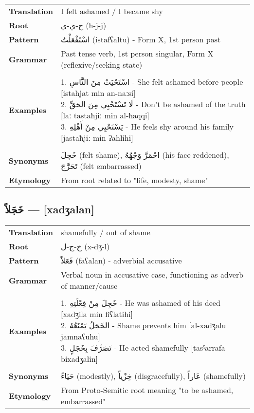 \documentclass[letterpaper,12pt]{article}
\begin{document}
\begin{tabular}{p{3cm}p{10cm}}
\toprule
\textbf{Translation} & I felt ashamed / I became shy \\
\textbf{Root} & \textarabic{ح-ي-ي} (ħ-j-j) \\
\textbf{Pattern} & \textarabic{اسْتَفْعَلْتُ} (istafʕaltu) - Form X, 1st person past \\
\textbf{Grammar} & Past tense verb, 1st person singular, Form X (reflexive/seeking state) \\
\midrule \\
\textbf{Examples} & \makecell[l]{\parbox{9.5cm}{
1. \textarabic{اسْتَحْيَتْ مِنَ النَّاسِ} - She felt ashamed before people [istaħjat min an-naːsi]\\
2. \textarabic{لَا تَسْتَحْيِي مِنَ الحَقِّ} - Don't be ashamed of the truth [laː tastaħjiː min al-ħaqqi]\\
3. \textarabic{يَسْتَحْيِي مِنْ أَهْلِهِ} - He feels shy around his family [jastaħjiː min ʔahlihi]
}} \\
\midrule \\
\textbf{Synonyms} & \textarabic{خَجِلَ} (felt shame), \textarabic{احْمَرَّ وَجْهُهُ} (his face reddened), \textarabic{تَحَرَّجَ} (felt embarrassed) \\
\textbf{Etymology} & From root related to "life, modesty, shame" \\
\bottomrule
\end{tabular}

\subsection{\textarabic{خَجَلاً} — [xadʒalan]}

\begin{tabular}{p{3cm}p{10cm}}
\toprule
\textbf{Translation} & shamefully / out of shame \\
\textbf{Root} & \textarabic{خ-ج-ل} (x-dʒ-l) \\
\textbf{Pattern} & \textarabic{فَعَلاً} (faʕalan) - adverbial accusative \\
\textbf{Grammar} & Verbal noun in accusative case, functioning as adverb of manner/cause \\
\midrule \\
\textbf{Examples} & \makecell[l]{\parbox{9.5cm}{
1. \textarabic{خَجِلَ مِنْ فِعْلَتِهِ} - He was ashamed of his deed [xadʒila min fiʕlatihi]\\
2. \textarabic{الخَجَلُ يَمْنَعُهُ} - Shame prevents him [al-xadʒalu jamnaʕuhu]\\
3. \textarabic{تَصَرَّفَ بِخَجَلٍ} - He acted shamefully [tasˤarrafa bixadʒalin]
}} \\
\midrule \\
\textbf{Synonyms} & \textarabic{حَيَاءً} (modestly), \textarabic{خِزْياً} (disgracefully), \textarabic{عَاراً} (shamefully) \\
\textbf{Etymology} & From Proto-Semitic root meaning "to be ashamed, embarrassed" \\
\bottomrule

\end{tabular}
\end{document}
